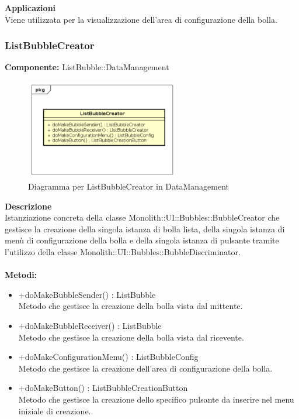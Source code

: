 \textbf{Applicazioni}\\
Viene utilizzata per la visualizzazione dell'area di configurazione della bolla. 


\clearpage

\subsubsection{ListBubbleCreator}
\textbf{Componente:}  ListBubble::DataManagement\\
   \FloatBarrier
   \begin{figure}[ht]
   \centering
   \includegraphics[width=0.6\textwidth]{img/single-ListBubbleCreator}
   \caption{{Diagramma per ListBubbleCreator in DataManagement}}
\end{figure}
\FloatBarrier
\textbf{Descrizione}\\
Istanziazione concreta della classe Monolith::UI::Bubbles::BubbleCreator che gestisce la creazione della singola istanza di bolla lista, della singola istanza di menù di configurazione della bolla e della singola istanza di pulsante tramite l'utilizzo della classe Monolith::UI::Bubbles::BubbleDiscriminator.
\\
\\
\textbf{Metodi:} 
\begin{itemize}
\item +doMakeBubbleSender() : ListBubble 
\\
Metodo che gestisce la creazione della bolla vista dal mittente.
\item +doMakeBubbleReceiver() : ListBubble 
\\
Metodo che gestisce la creazione della bolla vista dal ricevente.
\item +doMakeConfigurationMenu() : ListBubbleConfig 
\\
Metodo che gestisce la creazione dell'area di configurazione della bolla.
\item +doMakeButton() : ListBubbleCreationButton 
\\
Metodo che gestisce la creazione dello specifico pulsante da inserire nel menu iniziale di creazione.
\end{itemize} 


